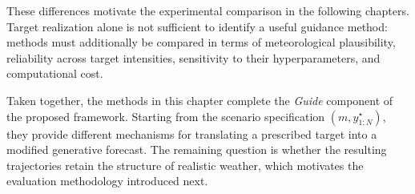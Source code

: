 These differences motivate the experimental comparison in the following
chapters. Target realization alone is not sufficient to identify a useful
guidance method: methods must additionally be compared in terms of
meteorological plausibility, reliability across target intensities, sensitivity
to their hyperparameters, and computational cost.

Taken together, the methods in this chapter complete the \emph{Guide} component
of the proposed framework. Starting from the scenario specification
\((m,y^\star_{1:N})\), they provide different mechanisms for translating a
prescribed target into a modified generative forecast. The remaining question
is whether the resulting trajectories retain the structure of realistic
weather, which motivates the evaluation methodology introduced next.